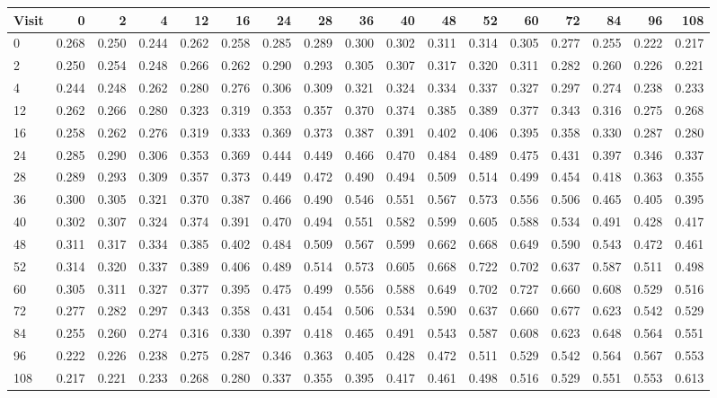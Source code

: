\small
\begin{tabular}{lrrrrrrrrrrrrrrrr}
\hline
Visit & 0 & 2 & 4 & 12 & 16 & 24 & 28 & 36 & 40 & 48 & 52 & 60 & 72 & 84 & 96 & 108 \\
\hline
0 & 0.268 & 0.250 & 0.244 & 0.262 & 0.258 & 0.285 & 0.289 & 0.300 & 0.302 & 0.311 & 0.314 & 0.305 & 0.277 & 0.255 & 0.222 & 0.217 \\
2 & 0.250 & 0.254 & 0.248 & 0.266 & 0.262 & 0.290 & 0.293 & 0.305 & 0.307 & 0.317 & 0.320 & 0.311 & 0.282 & 0.260 & 0.226 & 0.221 \\
4 & 0.244 & 0.248 & 0.262 & 0.280 & 0.276 & 0.306 & 0.309 & 0.321 & 0.324 & 0.334 & 0.337 & 0.327 & 0.297 & 0.274 & 0.238 & 0.233 \\
12 & 0.262 & 0.266 & 0.280 & 0.323 & 0.319 & 0.353 & 0.357 & 0.370 & 0.374 & 0.385 & 0.389 & 0.377 & 0.343 & 0.316 & 0.275 & 0.268 \\
16 & 0.258 & 0.262 & 0.276 & 0.319 & 0.333 & 0.369 & 0.373 & 0.387 & 0.391 & 0.402 & 0.406 & 0.395 & 0.358 & 0.330 & 0.287 & 0.280 \\
24 & 0.285 & 0.290 & 0.306 & 0.353 & 0.369 & 0.444 & 0.449 & 0.466 & 0.470 & 0.484 & 0.489 & 0.475 & 0.431 & 0.397 & 0.346 & 0.337 \\
28 & 0.289 & 0.293 & 0.309 & 0.357 & 0.373 & 0.449 & 0.472 & 0.490 & 0.494 & 0.509 & 0.514 & 0.499 & 0.454 & 0.418 & 0.363 & 0.355 \\
36 & 0.300 & 0.305 & 0.321 & 0.370 & 0.387 & 0.466 & 0.490 & 0.546 & 0.551 & 0.567 & 0.573 & 0.556 & 0.506 & 0.465 & 0.405 & 0.395 \\
40 & 0.302 & 0.307 & 0.324 & 0.374 & 0.391 & 0.470 & 0.494 & 0.551 & 0.582 & 0.599 & 0.605 & 0.588 & 0.534 & 0.491 & 0.428 & 0.417 \\
48 & 0.311 & 0.317 & 0.334 & 0.385 & 0.402 & 0.484 & 0.509 & 0.567 & 0.599 & 0.662 & 0.668 & 0.649 & 0.590 & 0.543 & 0.472 & 0.461 \\
52 & 0.314 & 0.320 & 0.337 & 0.389 & 0.406 & 0.489 & 0.514 & 0.573 & 0.605 & 0.668 & 0.722 & 0.702 & 0.637 & 0.587 & 0.511 & 0.498 \\
60 & 0.305 & 0.311 & 0.327 & 0.377 & 0.395 & 0.475 & 0.499 & 0.556 & 0.588 & 0.649 & 0.702 & 0.727 & 0.660 & 0.608 & 0.529 & 0.516 \\
72 & 0.277 & 0.282 & 0.297 & 0.343 & 0.358 & 0.431 & 0.454 & 0.506 & 0.534 & 0.590 & 0.637 & 0.660 & 0.677 & 0.623 & 0.542 & 0.529 \\
84 & 0.255 & 0.260 & 0.274 & 0.316 & 0.330 & 0.397 & 0.418 & 0.465 & 0.491 & 0.543 & 0.587 & 0.608 & 0.623 & 0.648 & 0.564 & 0.551 \\
96 & 0.222 & 0.226 & 0.238 & 0.275 & 0.287 & 0.346 & 0.363 & 0.405 & 0.428 & 0.472 & 0.511 & 0.529 & 0.542 & 0.564 & 0.567 & 0.553 \\
108 & 0.217 & 0.221 & 0.233 & 0.268 & 0.280 & 0.337 & 0.355 & 0.395 & 0.417 & 0.461 & 0.498 & 0.516 & 0.529 & 0.551 & 0.553 & 0.613 \\
\hline
\end{tabular}
